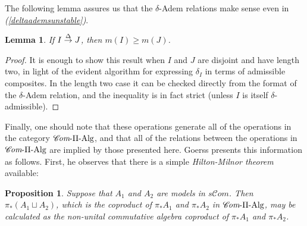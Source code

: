 \documentclass[11pt]{amsart}
\theoremstyle{plain}
\newtheorem{lem}[thm]{Lemma}
\newtheorem{prop}[thm]{Proposition}
\theoremstyle{definition}
\renewcommand{\to}{\longrightarrow}
\newcommand{\scrC}{\mathscr{C}}
\theoremstyle{plain}
\newcommand{\deltaalg}{\Delta} %
\newcommand{\PiAlg}{\textup{-$\Pi$-Alg}}
\newcommand{\minDimDelta}{m}
\newcommand{\produces}[3]{#3:#1\sim #2}
\renewcommand{\produces}[3]{#1\rightarrow_{#3} #2}%
\renewcommand{\produces}[3]{#1\overset{\smash{#3}}{\rightarrow} #2}%
\newcommand{\algs}{\scrC\!\textit{om}}
\begin{document}
\begin{Constructing homotopy and cohomotopy operations}
The following lemma assures us that the $\delta$-Adem relations make sense even in \emph{(\ref{deltaademsunstable})}.
\begin{lem}\label{lemOnAdemChangeInMDeltaPlain}
If $\produces{I}{J}{\deltaalg}$, then $\minDimDelta(I)\geq\minDimDelta(J)$.
\end{lem}
\begin{proof}
It is enough to show this result when $I$ and $J$ are disjoint and have length two, in light of the evident algorithm for expressing $\delta_I$ in terms of admissible composites. In the length two case it can be checked directly from the format of the $\delta$-Adem relation, and the inequality is in fact strict (unless $I$ is itself $\delta$-admissible).
\end{proof}
Finally, one should note that these operations generate all of the operations in the category $\algs\PiAlg$, and that all of the relations between the operations in $\algs\PiAlg$ are implied by those presented here. Goerss \cite[\S2]{MR1089001} presents this information as follows. First, he observes that there is a simple \emph{Hilton-Milnor theorem} available:
\begin{prop}
Suppose that $A_1$ and $A_2$ are models in $s\algs$. Then $\pi_*(A_1\sqcup A_2)$, which is the coproduct of $\pi_*A_1$ and $\pi_*A_2$ in $\algs\PiAlg$, may be calculated as the non-unital commutative algebra coproduct of $\pi_*A_1$ and $\pi_*A_2$.
\end{prop}

\end{Constructing homotopy and cohomotopy operations}
\end{document}
